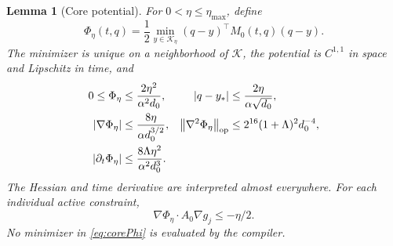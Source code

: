 \documentclass[11pt]{article}
\numberwithin{equation}{section}
\newtheorem{lemma}[theorem]{Lemma}
\theoremstyle{definition}
\theoremstyle{remark}\newtheorem{remark}[theorem]{Remark}
\newcommand{\K}{\mathcal K}
\newcommand{\norm}[1]{\left\|#1\right\|}
\begin{document}
\begin{lemma}[Core potential]\label{lem:corepotential}
For $0<\eta\le\eta_{\max}$, define
\begin{equation}\label{eq:corePhi}
 \Phi_\eta(t,q)=\frac12\min_{y\in\K_\eta}
                      (q-y)^\top M_0(t,q)(q-y).
\end{equation}
The minimizer is unique on a neighborhood of $\K$, the potential is
$C^{1,1}$ in space and Lipschitz in time, and
\begin{align}
 0\le\Phi_\eta&\le\frac{2\eta^2}{\alpha^2d_0},
 &|q-y_*|&\le\frac{2\eta}{\alpha\sqrt{d_0}},\label{eq:Phirange}\\
 |\nabla\Phi_\eta|&\le\frac{8\eta}{\alpha d_0^{3/2}},
 &\norm{\nabla^2\Phi_\eta}_{\rm op}
   &\le2^{16}(1+\Lambda)^2d_0^{-4},\label{eq:Phiderivative}\\
 |\partial_t\Phi_\eta|&\le
               \frac{8\Lambda\eta^2}{\alpha^2d_0^3}.
 \label{eq:Phitime}
\end{align}
The Hessian and time derivative are interpreted almost everywhere. For
each individual active constraint,
\begin{equation}\label{eq:Phicontact}
 \nabla\Phi_\eta\cdot A_0\nabla g_j\le-\eta/2.
\end{equation}
No minimizer in \eqref{eq:corePhi} is evaluated by the compiler.
\end{lemma}
\end{document}
